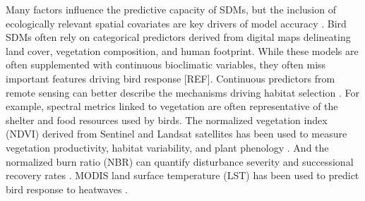 \documentclass[preprint, 3p,
authoryear]{elsarticle} %
\begin{document}
Many factors influence the predictive capacity of SDMs, but the
inclusion of ecologically relevant spatial covariates are key drivers of
model accuracy
\citep{Franklin1995, Vaughn2003, fourcadePaintingsPredictDistribution2018}.
Bird SDMs often rely on categorical predictors derived from digital maps
delineating land cover, vegetation composition, and human footprint.
While these models are often supplemented with continuous bioclimatic
variables, they often miss important features driving bird response
{[}REF{]}. Continuous predictors from remote sensing can better describe
the mechanisms driving habitat selection
\citep{heWillRemoteSensing2015}. For example, spectral metrics linked to
vegetation are often representative of the shelter and food resources
used by birds. The normalized vegetation index (NDVI) derived from
Sentinel and Landsat satellites has been used to measure vegetation
productivity, habitat variability, and plant phenology
\citep{pettorelliNormalizedDifferenceVegetation2011}. And the normalized
burn ratio (NBR) can quantify disturbance severity and successional
recovery rates \citep{hislopUsingLandsatSpectral2018}. MODIS land
surface temperature (LST) has been used to predict bird response to
heatwaves \citep{albrightHeatWavesMeasured2011}.
\end{document}
